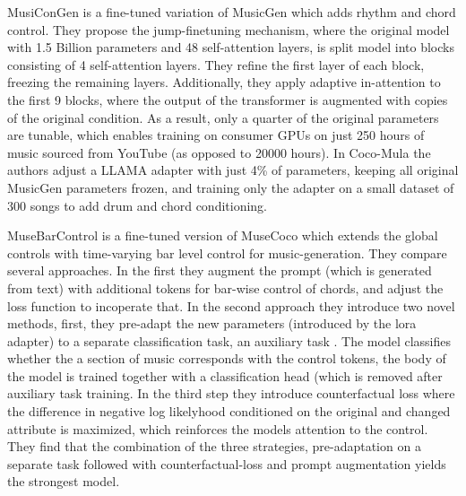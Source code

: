 MusiConGen \cite{Lan_Hsiao_Cheng_Yang_musicongen_2024} is a fine-tuned variation of MusicGen which adds rhythm and chord control. They propose the jump-finetuning mechanism, where the original model with 1.5 Billion parameters and 48 self-attention layers, is split model into blocks consisting of 4 self-attention layers. They refine the first layer of each block, freezing the remaining layers. Additionally, they apply adaptive in-attention to the first 9 blocks, where the output of the transformer is augmented with copies of the original condition. As a result, only a quarter of the original parameters are tunable, which enables training on consumer GPUs on just 250 hours of music sourced from YouTube (as opposed to 20000 hours).  In Coco-Mula \cite{Lin_cocomulla_2024} the authors adjust a LLAMA adapter with just 4\% of parameters, keeping all original MusicGen parameters frozen, and training only the adapter on a small dataset of 300 songs to add drum and chord conditioning. 

MuseBarControl \cite{Shu_Xu_Musebarcontrol_2024} is a fine-tuned version of MuseCoco\cite{Lu_Xu_Kang_Yu_Xing_Tan_Bian_MuseCoco_2023} which extends the global controls with time-varying bar level control for music-generation. They compare several approaches. In the first they augment the prompt (which is generated from text) with additional tokens for bar-wise control of chords, and adjust the loss function to incoperate that.  In the second approach they introduce two novel methods, first, they pre-adapt the new parameters (introduced by the lora adapter) to a separate classification task, an auxiliary task . The model classifies whether the a section of music corresponds with the control tokens, the body of the model is trained together with a classification head (which is removed after auxiliary task training. In the third step they introduce counterfactual loss where the difference in negative log likelyhood conditioned on the original and changed attribute is maximized, which reinforces the models attention to the control. They find that the combination of the three strategies, pre-adaptation on a separate task followed with counterfactual-loss and prompt augmentation yields the strongest model. 


